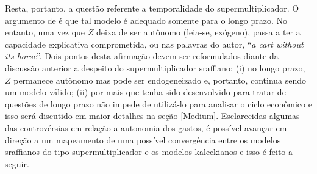 Resta, portanto, a questão referente a temporalidade do supermultiplicador. O argumento de \citeauthor*{nikiforos_comments_2018} é que tal modelo é adequado somente para o longo prazo. No entanto, uma vez que $Z$ deixa de ser autônomo (leia-se, exógeno), passa a ter a capacidade explicativa comprometida, ou nas palavras do autor, ``\textit{a cart without its horse}''. 
Dois pontos desta afirmação devem ser reformulados diante da discussão anterior a despeito do supermultiplicador sraffiano: (i) no longo prazo, $Z$ permanece autônomo mas pode ser endogeneizado e, portanto, continua sendo um modelo válido; (ii) por mais que tenha sido desenvolvido para tratar de questões de longo prazo não impede de utilizá-lo para analisar o ciclo econômico e isso será discutido em maior detalhes na seção \ref{Medium}.
Esclarecidas algumas das controvérsias em relação a autonomia dos gastos, é possível avançar em direção a um mapeamento de uma possível convergência entre os modelos sraffianos do tipo supermultiplicador e os modelos kaleckianos e isso é feito a seguir.

